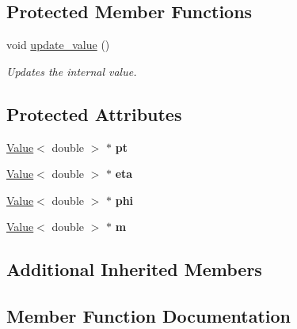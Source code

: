 \subsection*{Protected Member Functions}
\begin{DoxyCompactItemize}
\item 
void \hyperlink{classfilval_1_1root_1_1LorentzVector_aed3e0cbb782c738e5704188e9fae8b17}{update\+\_\+value} ()
\begin{DoxyCompactList}\small\item\em Updates the internal value. \end{DoxyCompactList}\end{DoxyCompactItemize}
\subsection*{Protected Attributes}
\begin{DoxyCompactItemize}
\item 
\hypertarget{classfilval_1_1root_1_1LorentzVector_afe652c2ce4541245a06070738d5042fd}{}\label{classfilval_1_1root_1_1LorentzVector_afe652c2ce4541245a06070738d5042fd} 
\hyperlink{classfilval_1_1Value}{Value}$<$ double $>$ $\ast$ {\bfseries pt}
\item 
\hypertarget{classfilval_1_1root_1_1LorentzVector_af2fa43de5f90fe465034dadb63da87b1}{}\label{classfilval_1_1root_1_1LorentzVector_af2fa43de5f90fe465034dadb63da87b1} 
\hyperlink{classfilval_1_1Value}{Value}$<$ double $>$ $\ast$ {\bfseries eta}
\item 
\hypertarget{classfilval_1_1root_1_1LorentzVector_a2c9b8c4f0d131e31676481fdd8e9441f}{}\label{classfilval_1_1root_1_1LorentzVector_a2c9b8c4f0d131e31676481fdd8e9441f} 
\hyperlink{classfilval_1_1Value}{Value}$<$ double $>$ $\ast$ {\bfseries phi}
\item 
\hypertarget{classfilval_1_1root_1_1LorentzVector_ad5201025b02148dec45b71cc1fe1740c}{}\label{classfilval_1_1root_1_1LorentzVector_ad5201025b02148dec45b71cc1fe1740c} 
\hyperlink{classfilval_1_1Value}{Value}$<$ double $>$ $\ast$ {\bfseries m}
\end{DoxyCompactItemize}
\subsection*{Additional Inherited Members}


\subsection{Member Function Documentation}
\hypertarget{classfilval_1_1root_1_1LorentzVector_aed3e0cbb782c738e5704188e9fae8b17}{}\label{classfilval_1_1root_1_1LorentzVector_aed3e0cbb782c738e5704188e9fae8b17} 
